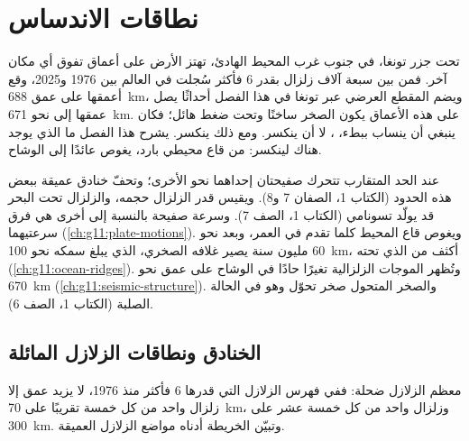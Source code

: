 \chapter{نطاقات الاندساس}\label{ch:g11:subduction-zones}

تحت جزر تونغا، في جنوب غرب المحيط الهادئ، تهتز الأرض على أعماق
تفوق أي مكان آخر. فمن بين سبعة آلاف زلزال بقدر
6 فأكثر سُجلت في العالم بين 1976 و2025، وقع أعمقها على عمق
\qty{688}{km}، ويضم المقطع العرضي عبر تونغا في هذا الفصل أحداثًا يصل عمقها
إلى نحو \qty{671}{km}. على هذه الأعماق يكون الصخر ساخنًا وتحت ضغط
هائل؛ فكان ينبغي أن ينساب ببطء، ، لا أن ينكسر. ومع ذلك
ينكسر. يشرح هذا الفصل ما الذي يوجد هناك لينكسر:  من قاع محيطي
بارد، يغوص عائدًا إلى الوشاح.

\begin{recall}
عند الحد المتقارب تتحرك صفيحتان إحداهما نحو الأخرى؛ وتحفّ خنادق عميقة
ببعض هذه الحدود (الكتاب 1، الصفان 7 و8). ويقيس قدر الزلزال
حجمه، والزلزال تحت البحر قد يولّد تسونامي
(الكتاب 1، الصف 7). وسرعة صفيحة بالنسبة إلى أخرى هي
فرق سرعتيهما (\cref{ch:g11:plate-motions}). ويغوص قاع المحيط
كلما تقدم في العمر، وبعد نحو 60 مليون سنة يصير غلافه الصخري، الذي يبلغ سمكه نحو
\qty{100}{km}، أكثف من  الذي تحته
(\cref{ch:g11:ocean-ridges}). وتُظهر الموجات الزلزالية تغيرًا حادًا في الوشاح
على عمق نحو \qty{670}{km} (\cref{ch:g11:seismic-structure}). والصخر المتحول
صخر تحوّل وهو في الحالة الصلبة (الكتاب 1، الصف 6).
\end{recall}

\section{الخنادق ونطاقات الزلازل المائلة}

معظم الزلازل ضحلة: ففي فهرس الزلازل التي قدرها 6 فأكثر منذ
1976، لا يزيد عمق إلا زلزال واحد من كل خمسة تقريبًا على \qty{70}{km}، وزلزال واحد من كل خمسة عشر
على \qty{300}{km}. وتبيّن الخريطة أدناه مواضع الزلازل العميقة.

